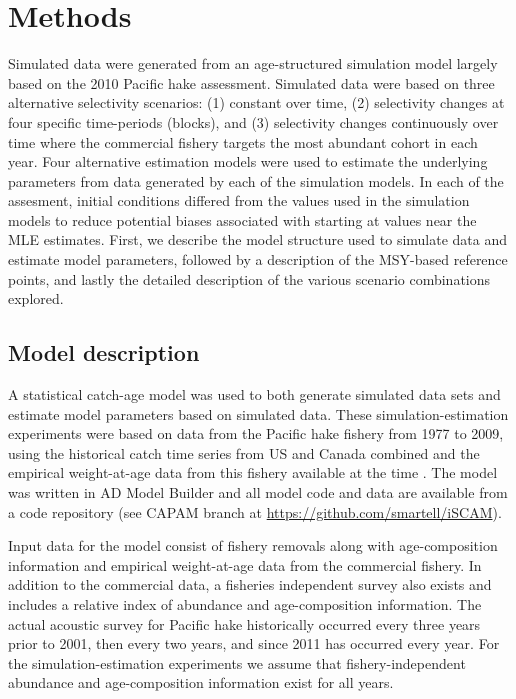 \documentclass[review,letterpaper,10pt,authoryear]{elsarticle}
\begin{document}

	\section*{Methods} %
\label{sec:methods}


Simulated data were generated from an age-structured simulation model largely based on the 2010 Pacific hake assessment.  Simulated data were based on three alternative selectivity scenarios: (1) constant over time, (2) selectivity changes at four specific time-periods (blocks), and (3) selectivity changes continuously over time where the commercial fishery targets the most abundant cohort in each year. Four alternative estimation models were used to estimate the underlying parameters from data generated by each of the simulation models. In each of the assesment, initial conditions differed from the values used in the simulation models to reduce potential biases associated with starting at values near the MLE estimates.   First, we describe the model structure used to simulate data and estimate model parameters, followed by a description of the MSY-based reference points, and lastly the detailed description of the various scenario combinations explored.

\subsection*{Model description} %
\label{sub:model_description}

A statistical catch-age model was used to both generate simulated data sets and estimate model parameters based on simulated data. These simulation-estimation experiments were based on data from the Pacific hake fishery from 1977 to 2009, using the historical catch time series from US and Canada combined and the empirical weight-at-age data from this fishery available at the time \citep{Martell2009}.  The model was written in AD Model Builder \citep{fournier2011ad} and all model code and data are available from a code repository (see CAPAM branch at \url{https://github.com/smartell/iSCAM}).

Input data for the model consist of fishery removals along with age-composition information and empirical weight-at-age data from the commercial fishery.  In addition to the commercial data, a fisheries independent survey also exists and includes a relative index of abundance and age-composition information.  The actual acoustic survey for Pacific hake historically occurred every three years prior to 2001, then every two years, and since 2011 has occurred every year. For the simulation-estimation experiments we assume that fishery-independent abundance and age-composition information exist for all years.
\end{document}
